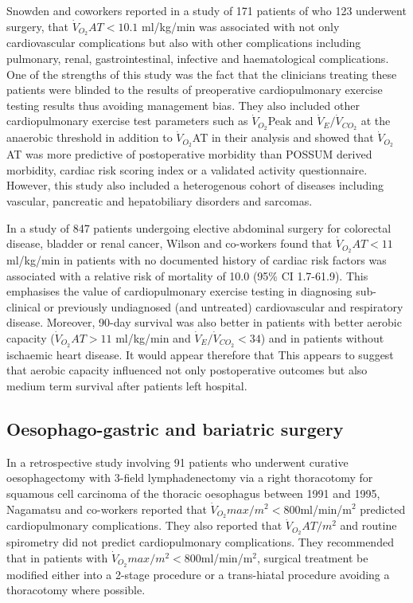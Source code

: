 Snowden and coworkers reported in a study of 171 patients of who 123 underwent surgery, that $\dot{V}_{O_2}AT<10.1$ ml/kg/min was associated with not only cardiovascular complications but also with other complications including pulmonary, renal, gastrointestinal, infective and haematological complications. One of the strengths of this study was the fact that the clinicians treating these patients were blinded to the results of preoperative cardiopulmonary exercise testing results thus avoiding management bias. They also included other cardiopulmonary exercise test parameters such as $\dot{V}_{O_2}$Peak and $\dot{V}_E/\dot{V}_{CO_2}$ at the anaerobic threshold in addition to $\dot{V}_{O_2}$AT in their analysis and showed that $\dot{V}_{O_2}$AT was more predictive of postoperative morbidity than POSSUM derived morbidity, cardiac risk scoring index or a validated activity questionnaire. However, this study also included a heterogenous cohort of diseases including vascular, pancreatic and hepatobiliary disorders and sarcomas.\parencite{snowden_submaximal_2010}

In a study of 847 patients undergoing elective abdominal surgery for colorectal disease, bladder or renal cancer, Wilson and co-workers found that $\dot{V}_{O_2}AT<11$ ml/kg/min in patients with no documented history of cardiac risk factors was associated with a relative risk of mortality of 10.0 (95\% CI 1.7-61.9).\parencite{wilson_impaired_2010} This emphasises the value of cardiopulmonary exercise testing in diagnosing sub-clinical or previously undiagnosed (and untreated) cardiovascular and respiratory disease. Moreover, 90-day survival was also better in patients with better aerobic capacity ($\dot{V}_{O_2}AT>11$ ml/kg/min and $\dot{V}_E/\dot{V}_{CO_2}<34$) {a}nd in patients without ischaemic heart disease. It would appear therefore that This appears to suggest that aerobic capacity influenced not only postoperative outcomes but also medium term survival after patients left hospital.

\subsection{Oesophago-gastric and bariatric surgery}
In a retrospective study involving 91 patients who underwent curative oesophagectomy with 3-field lymphadenectomy via a
right thoracotomy for squamous cell carcinoma of the thoracic oesophagus between 1991 and 1995, Nagamatsu and co-workers reported that $\dot{V}_{O_2}max/m^2<800$ml/min/m$^2$ predicted cardiopulmonary complications.\parencite{nagamatsu_preoperative_2001} They also reported that $\dot{V}_{O_2}AT/m^2$ and routine spirometry did not predict cardiopulmonary complications. They recommended that in patients with $\dot{V}_{O_2}max/m^2<800$ml/min/m$^2$, surgical treatment be modified either into a 2-stage procedure or a trans-hiatal procedure avoiding a thoracotomy where possible.

